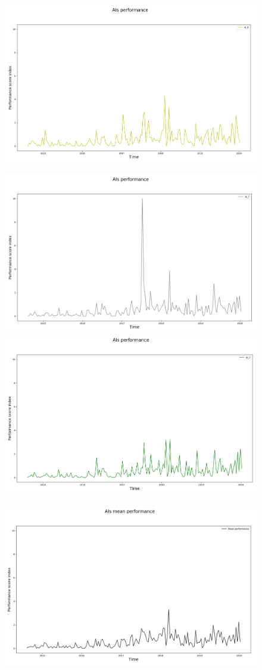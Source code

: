 \documentclass[a4paper,12pt]{report}
\begin{document}
\begin{fig}
\begin{fig}
\begin{subfigure}{\linewidth}
		\includegraphics[width=.5\linewidth]{performance_ai8}
		\end{subfigure}
		\begin{subfigure}{\linewidth}
		\includegraphics[width=.5\linewidth]{performance_ai7}
		\includegraphics[width=.5\linewidth]{performance_ai2}
		\end{subfigure}
		\begin{subfigure}{\linewidth}
		\includegraphics[width=.5\linewidth]{performance_ai_mean}
		\end{subfigure}
	\label{Figura 21}
\end{fig}

\end{fig}
\end{document}
